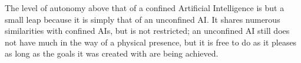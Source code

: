 The level of autonomy above that of a confined Artificial Intelligence is but a small leap because it is simply that of an unconfined AI. It shares numerous similarities with confined AIs, but is not restricted; an unconfined AI still does not have much in the way of a physical presence, but it is free to do as it pleases as long as the goals it was created with are being achieved.